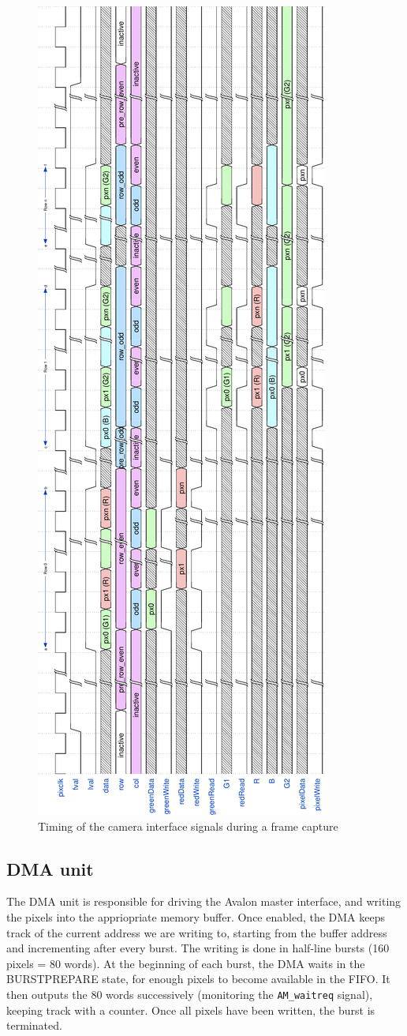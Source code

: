 \documentclass[12pt,a4paper]{article}
\begin{document}
\begin{figure}[p]
	\centering
	\includegraphics[width=.51\textwidth]{figures/camera_timings_rot}
	\caption{Timing of the camera interface signals during a frame capture}
	\label{fig:camtime}
\end{figure}

\newpage
\subsection{DMA unit}

The DMA unit is responsible for driving the Avalon master interface, and writing the pixels into the appriopriate memory buffer. Once enabled, the DMA keeps track of the current address we are writing to, starting from the buffer address and incrementing after every burst. The writing is done in half-line bursts (160 pixels = 80 words). At the beginning of each burst, the DMA waits in the BURSTPREPARE state, for enough pixels to become available in the FIFO. It then outputs the 80 words successively (monitoring the \texttt{AM\_waitreq} signal), keeping track with a counter. Once all pixels have been written, the burst is terminated.
\end{document}
